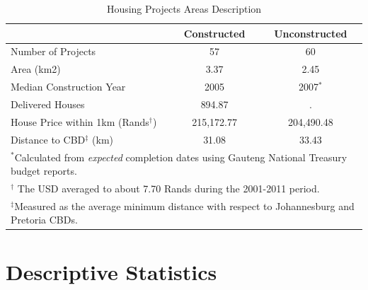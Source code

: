 \documentclass[12pt]{article}
\begin{document}
\begin{table}[b!]
\centering
\caption{Housing Projects Areas Description}\label{table:projectdescriptives}
\vspace{-2mm}
\begin{tabular}{l*{1}{cc}}
\toprule
  &Constructed &Unconstructed \\
\midrule
Number of Projects  &       57 &       60 \\
Area (km2) &       3.37 &       2.45  \\
Median Construction Year & 2005 & 2007$^*$\\
Delivered Houses  &     894.87 & .      \\
House Price within 1km (Rands$^\dagger$) &   215,172.77   &   204,490.48   \\
Distance to CBD$^\ddagger$ (km) &  31.08  &     33.43   \\
\bottomrule
\multicolumn{3}{l}{\scriptsize $^*$Calculated from {\it expected} completion dates using Gauteng National Treasury budget reports.}\\[-.5em]
\multicolumn{3}{l}{\scriptsize $^\dagger$ The USD averaged to about 7.70 Rands during the 2001-2011 period.}\\[-.5em]
\multicolumn{3}{l}{\scriptsize $^\ddagger$Measured as the average minimum distance with respect to Johannesburg and Pretoria CBDs. }
\end{tabular}
\end{table} 

\section{Descriptive Statistics}\label{section:descriptives}


\end{document}
